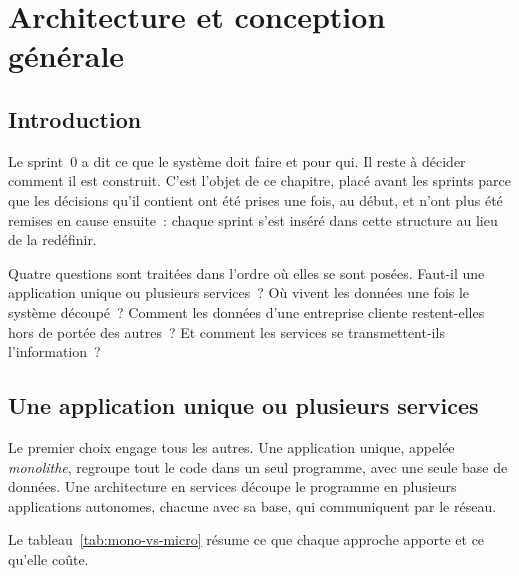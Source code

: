 %
\chapter{Architecture et conception générale}
\label{ch:archi}

\section{Introduction}

Le sprint~0 a dit ce que le système doit faire et pour qui. Il reste à décider comment il est
construit. C'est l'objet de ce chapitre, placé avant les sprints parce que les décisions qu'il
contient ont été prises une fois, au début, et n'ont plus été remises en cause ensuite~: chaque
sprint s'est inséré dans cette structure au lieu de la redéfinir.

Quatre questions sont traitées dans l'ordre où elles se sont posées. Faut-il une application unique
ou plusieurs services~? Où vivent les données une fois le système découpé~? Comment les données
d'une entreprise cliente restent-elles hors de portée des autres~? Et comment les services se
transmettent-ils l'information~?

\section{Une application unique ou plusieurs services}

Le premier choix engage tous les autres. Une application unique, appelée \emph{monolithe}, regroupe tout
le code dans un seul programme, avec une seule base de données. Une architecture en services découpe
le programme en plusieurs applications autonomes, chacune avec sa base, qui communiquent par le
réseau.

Le tableau~\ref{tab:mono-vs-micro} résume ce que chaque approche apporte et ce qu'elle coûte.

